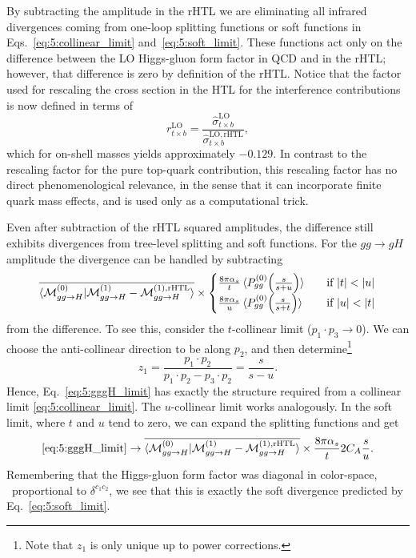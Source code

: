 By subtracting the amplitude in the \acs{rHTL} we are eliminating all infrared divergences coming from one-loop splitting functions or soft functions in Eqs.~\eqref{eq:5:collinear_limit} and\ \eqref{eq:5:soft_limit}. These functions act only on the difference between the \acs{LO} Higgs-gluon form factor in \acs{QCD} and in the \acs{rHTL}; however, that difference is zero by definition of the \acs{rHTL}. Notice that the factor used for rescaling the cross section in the \acs{HTL} for the interference contributions is now defined in terms of
\begin{equation}
r^\mathrm{LO}_{t \times b} = \frac{\hat{\sigma}_{t \times b}^{\mathrm{LO}}}{\hat{\sigma}_{t \times b}^{\mathrm{LO}, \mathrm{rHTL}}},
\end{equation}
which for on-shell masses yields approximately $-0.129$. In contrast to the rescaling factor for the pure top-quark contribution, this rescaling factor has no direct phenomenological relevance, in the sense that it can incorporate finite quark mass effects, and is used only as a computational trick.

Even after subtraction of the \acs{rHTL} squared amplitudes, the difference still exhibits divergences from tree-level splitting and soft functions. For the $gg \longrightarrow g H$ amplitude the divergence can be handled by subtracting
\begin{equation}
\overline{\braket{\mathcal{M}^{(0)}_{gg \rightarrow H} | \mathcal{M}^{(1)}_{gg \rightarrow H} - \mathcal{M}^{(1), \text{rHTL}}_{gg \rightarrow H}}}  \times \begin{cases} \frac{8 \pi \alpha_s}{t} \braket{P_{gg}^{(0)} \!\left(\frac{s}{s + u} \right)} \quad &\text{if } |t| < |u| \\
\frac{8 \pi \alpha_s}{u} \braket{P_{gg}^{(0)} \!\left(\frac{s}{s + t} \right)} \quad &\text{if } |u| < |t|
\end{cases}
\label{eq:5:gggH_limit}
\end{equation}
from the difference. To see this, consider the $t$-collinear limit ($p_1 \cdot p_3 \rightarrow 0$). We can choose the anti-collinear direction to be along $p_2$, and then determine\footnote{Note that $z_1$ is only unique up to power corrections.}
\begin{equation}
z_1 = \frac{p_1 \cdot p_2}{p_1 \cdot p_2 - p_3 \cdot p_2} = \frac{s}{s - u}.
\end{equation}
Hence, Eq.~\eqref{eq:5:gggH_limit} has exactly the structure required from a collinear limit \eqref{eq:5:collinear_limit}. The $u$-collinear limit works analogously. In the soft limit, where $t$ and $u$ tend to zero, we can expand the splitting functions and get
\begin{equation}
\eqref{eq:5:gggH_limit} \rightarrow \overline{\braket{\mathcal{M}^{(0)}_{gg \rightarrow H} | \mathcal{M}^{(1)}_{gg \rightarrow H} - \mathcal{M}^{(1), \text{rHTL}}_{gg \rightarrow H}}}  \times  \frac{8 \pi \alpha_s}{t} 2 C_A \frac{s}{u}.
\end{equation}
Remembering that the Higgs-gluon form factor was diagonal in color-space, \ie\ proportional to $\delta^{c_1 c_2}$, we see that this is exactly the soft divergence predicted by Eq.~\eqref{eq:5:soft_limit}.

